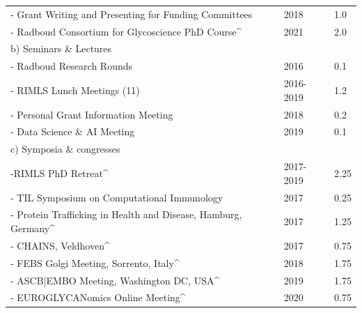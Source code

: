 \begin{table}[h]
{\begin{tabular}{llllll}
\multicolumn{4}{l}{- Grant Writing and Presenting for Funding Committees}                           & 2018      & 1.0                  \\
\multicolumn{4}{l}{- Radboud Consortium for Glycoscience PhD Course\textasciicircum{}}              & 2021      & 2.0                  \\ \hline
\multicolumn{4}{l}{b) Seminars \& Lectures}                                                         &           &                      \\
\multicolumn{4}{l}{- Radboud Research Rounds}                                                       & 2016      & 0.1                  \\
\multicolumn{4}{l}{- RIMLS Lunch Meetings (11)}                                                     & 2016-2019 & 1.2                  \\
\multicolumn{4}{l}{- Personal Grant Information Meeting}                                            & 2018      & 0.2                  \\
\multicolumn{4}{l}{- Data Science \& AI Meeting}                                                    & 2019      & 0.1                  \\ \hline
\multicolumn{4}{l}{c) Symposia \& congresses}                                                       &           &                      \\
\multicolumn{4}{l}{-RIMLS PhD Retreat\textasciicircum{}}                                            & 2017-2019 & 2.25                 \\
\multicolumn{4}{l}{- TIL Symposium on Computational Immunology}                                     & 2017      & 0.25                 \\
\multicolumn{4}{l}{- Protein Trafficking in Health and Disease, Hamburg, Germany\textasciicircum{}} & 2017      & 1.25                 \\
\multicolumn{4}{l}{- CHAINS, Veldhoven\textasciicircum{}}                                           & 2017      & 0.75                 \\
\multicolumn{4}{l}{- FEBS Golgi Meeting, Sorrento, Italy\textasciicircum{}}                         & 2018      & 1.75                 \\
\multicolumn{4}{l}{- ASCB|EMBO Meeting, Washington DC, USA\textasciicircum{}}                       & 2019      & 1.75                 \\
\multicolumn{4}{l}{- EUROGLYCANomics Online Meeting\textasciicircum{}}                              & 2020      & 0.75                 \\ \hline

\end{tabular}}
\end{table}
